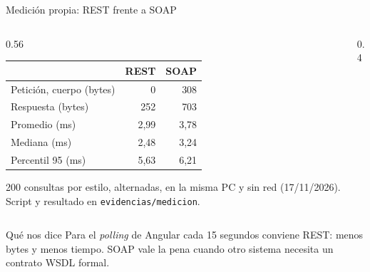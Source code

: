 \begin{frame}{Medición propia: REST frente a SOAP}
\begin{columns}[c]
\begin{column}{0.56\textwidth}
\footnotesize
\begin{tabular}{@{}lrr@{}}
\toprule
 & REST & SOAP \\
\midrule
Petición, cuerpo (bytes) & 0 & 308 \\
Respuesta (bytes) & 252 & 703 \\
Promedio (ms) & 2,99 & 3,78 \\
Mediana (ms) & 2,48 & 3,24 \\
Percentil 95 (ms) & 5,63 & 6,21 \\
\bottomrule
\end{tabular}
\par\vspace{6pt}
{\scriptsize 200 consultas por estilo, alternadas, en la misma PC y sin red (17/11/2026). Script y resultado en \texttt{evidencias/medicion}.\par}
\end{column}
\begin{column}{0.4\textwidth}
\vspace{10pt}
\end{column}
\end{columns}
\vspace{10pt}
\begin{block}{Qué nos dice}
Para el \emph{polling} de Angular cada 15 segundos conviene REST: menos bytes y menos tiempo. SOAP vale la pena cuando otro sistema necesita un contrato WSDL formal.
\end{block}
\end{frame}

